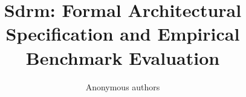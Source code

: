 \title{\textbf{Sdrm: Formal Architectural Specification and Empirical Benchmark Evaluation}}

\author{Anonymous authors}
